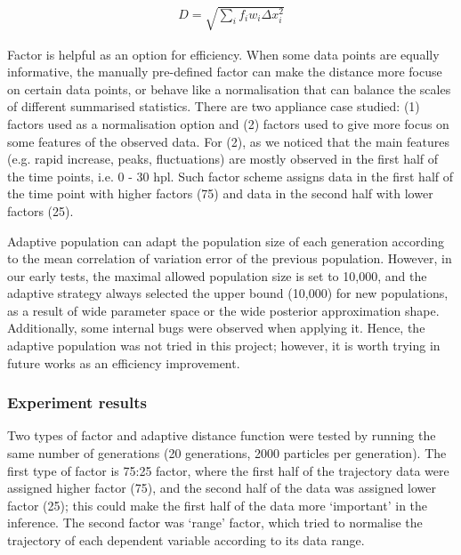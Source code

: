 \begin{align}
    \label{dis_f}
    D=\sqrt{\sum_i f_iw_i \Delta x_i^2}
\end{align}

Factor is helpful as an option for efficiency. When some data points are equally informative, the manually pre-defined factor can make the distance more focuse on certain data points, or behave like a normalisation that can balance the scales of different summarised statistics. There are two appliance case studied: (1) factors used as a normalisation option and (2) factors used to give more focus on some features of the observed data. For (2), as we noticed that the main features (e.g. rapid increase, peaks, fluctuations) are mostly observed in the first half of the time points, i.e. 0 - 30 hpl. Such factor scheme assigns data in the first half of the time point with higher factors (75) and data in the second half with lower factors (25).

Adaptive population \cite{population} can adapt the population size of each generation according to the mean correlation of variation error of the previous population. However, in our early tests,  the maximal allowed population size is set to 10,000, and the adaptive strategy always selected the upper bound (10,000) for new populations, as a result of wide parameter space or the wide posterior approximation shape. Additionally, some internal bugs were observed when applying it. Hence, the adaptive population was not tried in this project; however, it is worth trying in future works as an efficiency improvement.



\subsubsection{Experiment results}


Two types of factor and adaptive distance function were tested by running the same number of generations (20 generations, 2000 particles per generation). The first type of factor is 75:25 factor, where the first half of the trajectory data were assigned higher factor (75), and the second half of the data was assigned lower factor (25); this could make the first half of the data more `important' in the inference. The second factor was `range' factor, which tried to normalise the trajectory of each dependent variable according to its data range.

